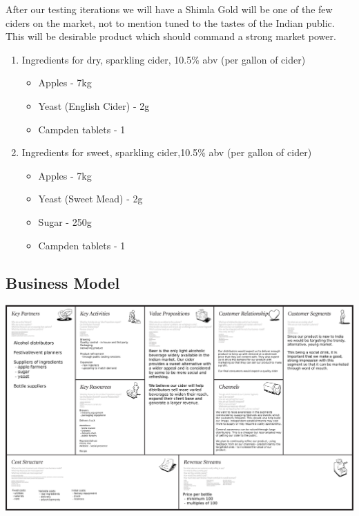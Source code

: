 \documentclass[11pt]{article}
\begin{document}
After our testing iterations we will
have a Shimla Gold will be one of the few ciders on the market, not to mention
tuned to the tastes of the Indian public. This will be desirable product which
should command a strong market power.

  \begin{enumerate}
    \item Ingredients for dry, sparkling cider, 10.5\% abv (per gallon of cider)
	  \begin{itemize}
	   \item Apples - 7kg
	   \item Yeast (English Cider) - 2g
	   \item Campden tablets - 1
       \end{itemize}
	\item Ingredients for sweet, sparkling cider,10.5\% abv (per gallon of cider)
	  \begin{itemize}
	  \item Apples - 7kg
	  \item Yeast (Sweet Mead) - 2g
	  \item Sugar - 250g
	  \item Campden tablets - 1
	  \end{itemize}
	\end{enumerate}

  \newpage
  \subsection{Business Model}
  \includegraphics[angle=90,width=\textwidth,height=\textheight,keepaspectratio]
{./business_model_canvas_poster.png}

\newpage
\end{document}
